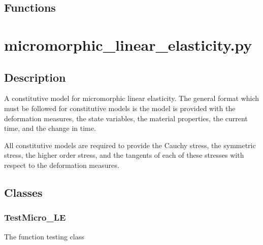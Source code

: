 \documentclass{asme2ej}
\begin{document}
\subsection{Functions}

\clearpage
\section{micromorphic\_linear\_elasticity.py}

\subsection{Description}

A constitutive model for micromorphic linear elasticity. The general format which must be followed for constitutive models is the model is provided with the deformation measures, the state variables, the material properties, the current time, and the change in time.

All constitutive models are required to provide the Cauchy stress, the symmetric stress, the higher order stress, and the tangents of each of these stresses with respect to the deformation measures.

\subsection{Classes}

\subsubsection{TestMicro\_LE}

The function testing class
\end{document}
